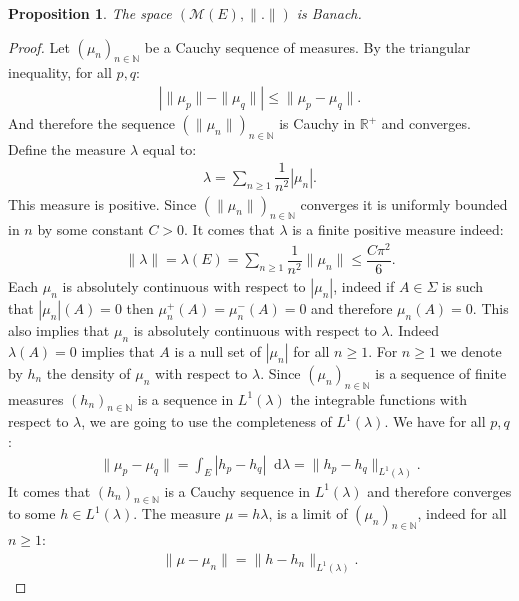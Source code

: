 \documentclass[11pt,a4paper]{article}
\newcommand{\RR}{\mathbb{R}}
\newcommand{\MC}{\mathcal{M}}
\newcommand{\Seq}[1]{\left(#1\right)_{n\in \mathbb{N}}}
\newcommand{\dd}{\mathop{}\!\mathrm{d}}
\newtheorem{proposition}[theorem]{Proposition}
\begin{document}
\begin{proposition}\label{prop:TV-banach}
    The space \(\left(\MC\left(E\right),\| .\|\right) \) is Banach.
\end{proposition}
\begin{proof}
    Let $\Seq{\mu_n}$ be a Cauchy sequence of measures. By the triangular inequality, for all $p,q$:
    \begin{align*}
       \left| \|\mu_p\| - \|\mu_q\|\right| \leq \|\mu_p - \mu_q\|.
    \end{align*}
    And therefore the sequence $\Seq{\|\mu_n\|}$ is Cauchy in $\RR^+$ and converges. Define the measure $\lambda$ equal to:
    \begin{align*}
        \lambda = \sum\limits_{n \geq 1} \dfrac{1}{n^2} |\mu_n|.
    \end{align*}
   This measure is positive. Since $\Seq{\|\mu_n\|}$ converges it is uniformly bounded in $n$ by some constant $C > 0$. It comes that $\lambda$ is a finite positive measure indeed:
    \begin{align*}
        \|\lambda\| = \lambda(E) = \sum\limits_{n \geq 1} \dfrac{1}{n^2}\|\mu_n\| \leq \dfrac{C\pi^2}{6}.
    \end{align*}
    Each $\mu_n$ is absolutely continuous with respect to $|\mu_n|$, indeed if $A \in \Sigma$ is such that $|\mu_n|(A) = 0$ then $\mu_n^+(A) = \mu_n^-(A) = 0$ and therefore $\mu_n(A)= 0$. This also implies that $\mu_n$ is absolutely continuous with respect to  $\lambda$. Indeed $\lambda(A)= 0$ implies that $A$ is a null set of $|\mu_n|$ for all $n \geq 1$. For $n \geq 1$ we denote by $h_n$ the density of $\mu_n$ with respect to $\lambda$. Since $\Seq{\mu_n}$ is a sequence of finite measures $\Seq{h_n}$ is a sequence in $L^1(\lambda)$ the integrable functions with respect to $\lambda$, we are going to use the completeness of $L^1(\lambda)$. We have for all $p,q$ :
    \begin{align*}
        \| \mu_p - \mu_q \| = \int_{E} |h_p - h_q| \dd\lambda = \|h_p - h_q \|_{L^1(\lambda)}.
    \end{align*}
    It comes that $\Seq{h_n}$ is a Cauchy sequence in $L^1(\lambda)$ and therefore converges to some $h \in L^1(\lambda)$. The measure $\mu = h\lambda$, is a limit of $\Seq{\mu_n}$, indeed for all $n \geq 1$:
    \begin{align*}
        \|\mu - \mu_n\| = \|h - h_n\|_{L^1(\lambda)}.
    \end{align*}
\end{proof}
\end{document}
